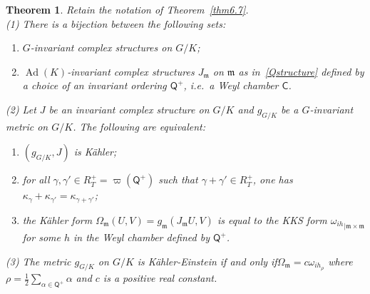 \documentclass[a4paper,reqno]{amsart}
\newtheorem{thm}{Theorem}[section]
\theoremstyle{definition}
\theoremstyle{remark}
\theoremstyle{plain}
\numberwithin{equation}{section}
\newcommand{\fm}{{\mathfrak{m}}}
\newcommand{\Csf}{{\mathsf{C}}}
\DeclareMathOperator{\Ad}{{Ad}}
\newcommand{\proots}{\mathsf{R}^+}
\newcommand{\rootsP}{\mathsf{P}}
\newcommand{\prootsP}{\mathsf{P}^+}
\newcommand{\prootsQ}{\mathsf{Q}^+}
\newcommand{\half}{{\frac{1}{2}}}
\newcommand{\kahler}{K\"ahler\xspace}
\newcommand{\sissi}{if and only if\xspace}
\begin{document}



\begin{thm}
  \label{thm6.8}
  Retain the notation of Theorem~\ref{thm6.7}.
  \\
  {\rm (1)} There is a  bijection  between the following sets:
  \begin{enumerate}[{\rm (i)}]
  \item $G$-invariant complex structures on $G/K$;
  \item $\Ad(K)$-invariant complex structures $J_\fm$ on $\fm$ as
    in~\eqref{Qstructure} defined by a choice of an invariant
    ordering $\prootsQ$, i.e.~a Weyl chamber $\Csf$.
 \end{enumerate}
{\rm (2)} Let $J$ be an invariant complex structure on $G/K$ and $g_{\scriptscriptstyle{G/K}}$
be a $G$-invariant metric on $G/K$.  The following are equivalent:
\begin{enumerate}[{\rm (i)}]
\item $(g_{\scriptscriptstyle{G/K}},J)$ is \kahler;
  \item for all $\gamma, \gamma' \in R_T^+=
\varpi(\prootsQ)$ such that $\gamma + \gamma'
    \in R_T^+$, one has $\kappa_\gamma + \kappa_{\gamma'} =
    \kappa_{\gamma + \gamma'}$;
    \item the \kahler form $\Omega_\fm(U,V)= g_{\fm}(J_\fm U,V)$
      is equal to the KKS form ${\omega_{ih}}_{\mid \fm\times \fm}$ for some $h$ in the
      Weyl chamber defined by $\prootsQ$.
      \end{enumerate}
      {\rm (3)} The metric $g_{\scriptscriptstyle{G/K}}$ on $G/K$ is \kahler-Einstein
      \sissi $\Omega_\fm = c {\omega_{ih_\rho}}$ where $\rho =
      \half \sum_{\alpha \in \prootsQ} \alpha$ and $c$ is
      a positive real constant.
\end{thm}
\end{document}
